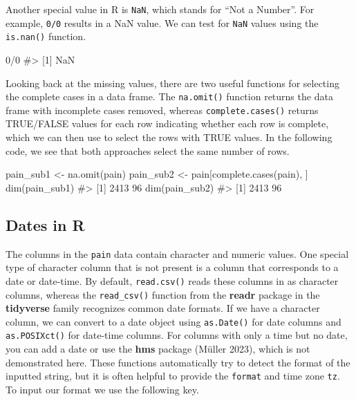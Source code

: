 \documentclass[
  letterpaper,
]{latex/krantz}
\makeatletter
\newenvironment{Shaded}{\begin{snugshade}}{\end{snugshade}}
\newcommand{\CommentTok}[1]{\textcolor[rgb]{0.37,0.37,0.37}{#1}}
\newcommand{\DecValTok}[1]{\textcolor[rgb]{0.68,0.00,0.00}{#1}}
\newcommand{\FunctionTok}[1]{\textcolor[rgb]{0.28,0.35,0.67}{#1}}
\newcommand{\NormalTok}[1]{\textcolor[rgb]{0.00,0.23,0.31}{#1}}
\newcommand{\OtherTok}[1]{\textcolor[rgb]{0.00,0.23,0.31}{#1}}
\newcommand{\SpecialCharTok}[1]{\textcolor[rgb]{0.37,0.37,0.37}{#1}}
\newenvironment{kframe}{%
\medskip{}
\setlength{\fboxsep}{.8em}
 \def\at@end@of@kframe{}%
 \ifinner\ifhmode%
  \def\at@end@of@kframe{\end{minipage}}%
  \begin{minipage}{\columnwidth}%
 \fi\fi%
 \def\FrameCommand##1{\hskip\@totalleftmargin \hskip-\fboxsep
 \colorbox{shadecolor}{##1}\hskip-\fboxsep
     \hskip-\linewidth \hskip-\@totalleftmargin \hskip\columnwidth}%
 \MakeFramed {\advance\hsize-\width
   \@totalleftmargin\z@ \linewidth\hsize
   \@setminipage}}%
 {\par\unskip\endMakeFramed%
 \at@end@of@kframe}
\renewenvironment{Shaded}{\begin{kframe}}{\end{kframe}}
\makeatother
\begin{document}
Another special value in R is \texttt{NaN}, which stands for ``Not a
Number''. For example, \texttt{0/0} results in a NaN value. We can test
for \texttt{NaN} values using the \texttt{is.nan()} function.

\begin{Shaded}
\begin{Highlighting}[]
\DecValTok{0}\SpecialCharTok{/}\DecValTok{0}
\CommentTok{\#\textgreater{} [1] NaN}
\end{Highlighting}
\end{Shaded}

Looking back at the missing values, there are two useful functions for
selecting the complete cases in a data frame. The
\texttt{na.omit()}
function returns the data frame with incomplete cases removed, whereas
\texttt{complete.cases()}
returns TRUE/FALSE values for each row indicating whether each row is
complete, which we can then use to select the rows with TRUE values. In
the following code, we see that both approaches select the same number
of rows.

\begin{Shaded}
\begin{Highlighting}[]
\NormalTok{pain\_sub1 }\OtherTok{\textless{}{-}} \FunctionTok{na.omit}\NormalTok{(pain)}
\NormalTok{pain\_sub2 }\OtherTok{\textless{}{-}}\NormalTok{ pain[}\FunctionTok{complete.cases}\NormalTok{(pain), ]}
\FunctionTok{dim}\NormalTok{(pain\_sub1)}
\CommentTok{\#\textgreater{} [1] 2413   96}
\FunctionTok{dim}\NormalTok{(pain\_sub2)}
\CommentTok{\#\textgreater{} [1] 2413   96}
\end{Highlighting}
\end{Shaded}

\subsection{\texorpdfstring{Dates in R
}{Dates in R }}\label{dates-in-r}

The columns in the \texttt{pain} data contain character and numeric
values. One special type of character column that is not present is a
column that corresponds to a date or date-time. By default,
\texttt{read.csv()} reads these columns in as character columns, whereas
the \texttt{read\_csv()} function from the
\textbf{readr} package in the \textbf{tidyverse}
family recognizes common date formats. If we have a character column, we
can convert to a date object using
\texttt{as.Date()} for
date columns and
\texttt{as.POSIXct()}
for date-time columns. For columns with only a time but no date, you can
add a date or use the \textbf{hms} package (Müller
2023), which is not demonstrated here. These functions automatically try
to detect the format of the inputted string, but it is often helpful to
provide the \texttt{format} and time zone \texttt{tz}. To input our
format we use the following key.
\end{document}

